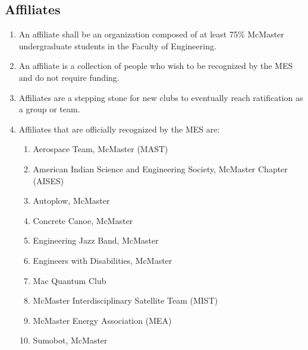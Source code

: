 \subsection{Affiliates}
\label{affiliates}
\begin{enumerate}
 \item
  An affiliate shall be an organization composed of at least 75\% McMaster undergraduate students in the Faculty of Engineering.
 \item
  An affiliate is a collection of people who wish to be recognized by the MES and do not require funding.
 \item
  Affiliates are a stepping stone for new clubs to eventually reach ratification as a group or team.
 \item
  Affiliates that are officially recognized by the MES are:

  \begin{enumerate}
   \item
    Aerospace Team, McMaster (MAST)
   \item
    American Indian Science and Engineering Society, McMaster Chapter (AISES)
   \item
    Autoplow, McMaster
   \item
    Concrete Canoe, McMaster
   \item
    Engineering Jazz Band, McMaster
   \item
    Engineers with Disabilities, McMaster
   \item
    Mac Quantum Club
   \item
    McMaster Interdisciplinary Satellite Team (MIST)
   \item
    McMaster Energy Association (MEA)
   \item
    Sumobot, McMaster
  \end{enumerate}
\end{enumerate}

